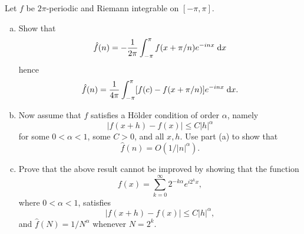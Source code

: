 \begin{exrc}[15]
    Let \(f\) be \(2\pi\)-periodic and Riemann integrable on \([-\pi, \pi]\).
    \begin{enumerate}[(a)]
    \item
        Show that
        \begin{equation*}
            \hat{f}(n) = -\frac{1}{2\pi} \int_{-\pi}^{\pi} f(x + \pi / n) e^{-inx} \;\mathrm d x
        \end{equation*}
        hence
        \begin{equation*}
            \hat{f}(n) = \frac{1}{4\pi} \int_{-\pi}^{\pi} [f(c) - f(x + \pi / n)]e^{-inx} \;\mathrm d x.
        \end{equation*}

    \item
        Now assume that \(f\) satisfies a Hölder condition of order \(\alpha\), namely
        \begin{equation*}
            |f(x + h) - f(x)| \leq C |h|^{\alpha}
        \end{equation*}
        for some \(0 < \alpha < 1\), some \(C > 0\), and all \(x, h\).
        Use part (a) to show that
        \begin{equation*}
            \hat{f}(n) = O(1 / |n|^\alpha).
        \end{equation*}

    \item
        Prove that the above result cannot be improved by showing that the function
        \begin{equation*}
            f(x) = \sum_{k = 0}^{\infty} 2^{-k\alpha} e^{i 2^k x},
        \end{equation*}
        where \(0 < \alpha < 1\), satisfies
        \begin{equation*}
            |f(x + h) - f(x)| \leq C |h|^\alpha,
        \end{equation*}
        and \(\hat{f}(N) = 1 / N^\alpha\) whenever \(N = 2^k\).
    \end{enumerate}


\end{exrc}
